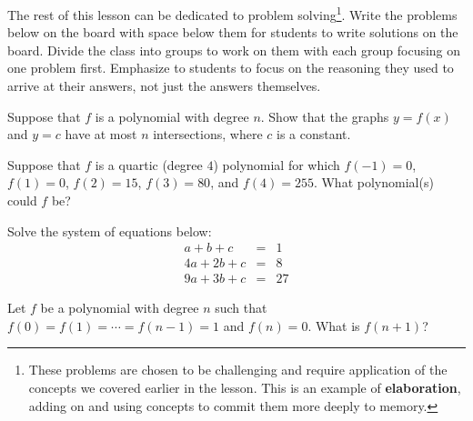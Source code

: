 The rest of this lesson can be dedicated to problem solving\footnote{These problems are chosen to be challenging and require application of the concepts we covered earlier in the lesson. This is an example of \textbf{elaboration}, adding on and using concepts to commit them more deeply to memory.}. Write the problems below on the board with space below them for students to write solutions on the board. Divide the class into groups to work on them with each group focusing on one problem first. Emphasize to students to focus on the reasoning they used to arrive at their answers, not just the answers themselves.

\begin{problem}
    Suppose that $f$ is a polynomial with degree $n$. Show that the graphs $y = f(x)$ and $y = c$ have at most $n$ intersections, where $c$ is a constant.
\end{problem}

\begin{problem}
    Suppose that $f$ is a quartic (degree $4$) polynomial for which $f(-1) = 0$, $f(1) = 0$, $f(2) = 15$, $f(3) = 80$, and $f(4) = 255$. What polynomial(s) could $f$ be?
\end{problem}

\begin{problem}
    Solve the system of equations below:
    \begin{eqnarray*}
        a+b+c &=& 1\\
        4a+2b+c &=& 8\\
        9a+3b+c &=& 27
    \end{eqnarray*}
\end{problem}

\begin{problem}
    Let $f$ be a polynomial with degree $n$ such that $f(0) = f(1) = \cdots = f(n-1) = 1$ and $f(n) = 0$. What is $f(n+1)$?
\end{problem}